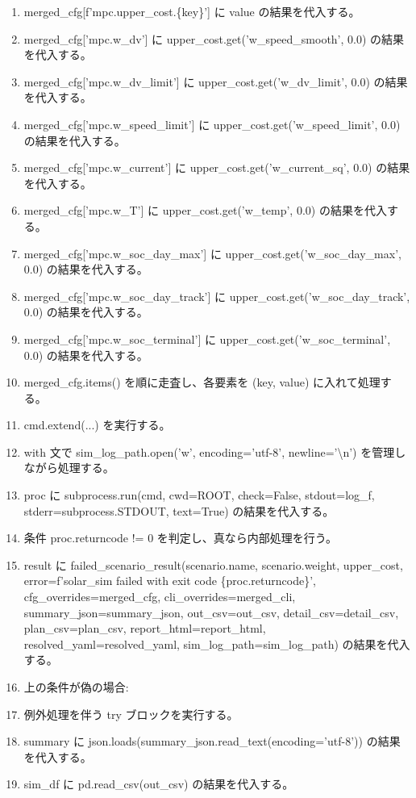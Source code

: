 \documentclass[a4paper,11pt]{article}
\begin{document}
\begin{enumerate}[leftmargin=1.8em]
\item   merged\_cfg[f'mpc.upper\_cost.\{key\}'] に value の結果を代入する。
\item merged\_cfg['mpc.w\_dv'] に upper\_cost.get('w\_speed\_smooth', 0.0) の結果を代入する。
\item merged\_cfg['mpc.w\_dv\_limit'] に upper\_cost.get('w\_dv\_limit', 0.0) の結果を代入する。
\item merged\_cfg['mpc.w\_speed\_limit'] に upper\_cost.get('w\_speed\_limit', 0.0) の結果を代入する。
\item merged\_cfg['mpc.w\_current'] に upper\_cost.get('w\_current\_sq', 0.0) の結果を代入する。
\item merged\_cfg['mpc.w\_T'] に upper\_cost.get('w\_temp', 0.0) の結果を代入する。
\item merged\_cfg['mpc.w\_soc\_day\_max'] に upper\_cost.get('w\_soc\_day\_max', 0.0) の結果を代入する。
\item merged\_cfg['mpc.w\_soc\_day\_track'] に upper\_cost.get('w\_soc\_day\_track', 0.0) の結果を代入する。
\item merged\_cfg['mpc.w\_soc\_terminal'] に upper\_cost.get('w\_soc\_terminal', 0.0) の結果を代入する。
\item merged\_cfg.items() を順に走査し、各要素を (key, value) に入れて処理する。
\item   cmd.extend(...) を実行する。
\item with 文で sim\_log\_path.open('w', encoding='utf-8', newline='\textbackslash{}n') を管理しながら処理する。
\item   proc に subprocess.run(cmd, cwd=ROOT, check=False, stdout=log\_f, stderr=subprocess.STDOUT, text=True) の結果を代入する。
\item 条件 proc.returncode != 0 を判定し、真なら内部処理を行う。
\item   result に failed\_scenario\_result(scenario.name, scenario.weight, upper\_cost, error=f'solar\_sim failed with exit code \{proc.returncode\}', cfg\_overrides=merged\_cfg, cli\_overrides=merged\_cli, summary\_json=summary\_json, out\_csv=out\_csv, detail\_csv=detail\_csv, plan\_csv=plan\_csv, report\_html=report\_html, resolved\_yaml=resolved\_yaml, sim\_log\_path=sim\_log\_path) の結果を代入する。
\item   上の条件が偽の場合:
\item   例外処理を伴う try ブロックを実行する。
\item     summary に json.loads(summary\_json.read\_text(encoding='utf-8')) の結果を代入する。
\item     sim\_df に pd.read\_csv(out\_csv) の結果を代入する。

\end{enumerate}
\end{document}
